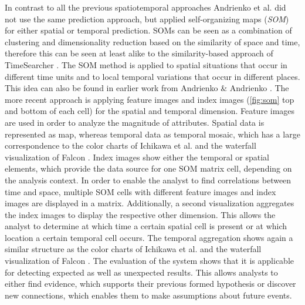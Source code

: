 \documentclass[electronic]{vgtc}             %
\begin{document}
In contrast to all the previous spatiotemporal approaches Andrienko et al. \cite{Andrienko:2010:Space} did not use the same prediction approach, but applied self-organizing maps (\textit{SOM}) for either spatial or temporal prediction.
SOMs can be seen as a combination of clustering and dimensionality reduction based on the similarity of space and time, therefore this can be seen at least alike to the similarity-based approach of TimeSearcher \cite{Hochheiser:2004, buono:2007, buono:2005}.
The SOM method is applied to spatial situations that occur in different time units and to local temporal variations that occur in different places.
This idea can also be found in earlier work from Andrienko \& Andrienko \cite{Andrienko:2005}.
The more recent approach is applying feature images and index images (\autoref{fig:som} top and bottom of each cell) for the spatial and temporal dimension.
Feature images are used in order to analyze the magnitude of attributes.
Spatial data is represented as map, whereas temporal data as temporal mosaic, which has a large correspondence to the color charts of Ichikawa et al. \cite{ichikawa:2002} and the waterfall visualization of Falcon \cite{steed:2017}.
Index images show either the temporal or spatial elements, which provide the data source for one SOM matrix cell, depending on the analysis context.
In order to enable the analyst to find correlations between time and space, multiple SOM cells with different feature images and index images are displayed in a matrix.
Additionally, a second visualization aggregates the index images to display the respective other dimension.
This allows the analyst to determine at which time a certain spatial cell is present or at which location a certain temporal cell occurs.
The temporal aggregation shows again a similar structure as the color charts of Ichikawa et al. \cite{ichikawa:2002} and the waterfall visualization of Falcon \cite{steed:2017}.
The evaluation of the system shows that it is applicable for detecting expected as well as unexpected results.
This allows analysts to either find evidence, which supports their previous formed hypothesis or discover new connections, which enables them to make assumptions about future events. 
\end{document}
